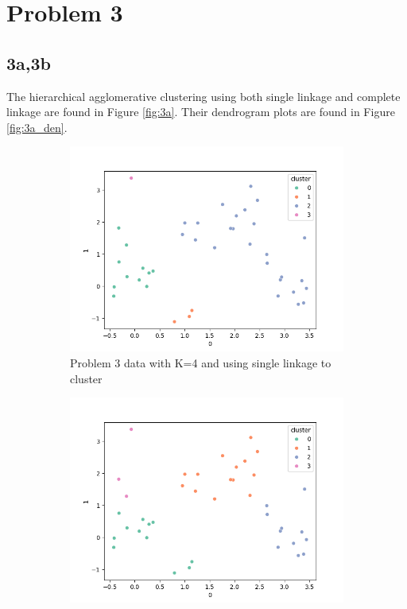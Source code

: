 \documentclass[12pt]{article}
\begin{document}
\clearpage


\section*{Problem 3}

\subsection*{3a,3b}

The hierarchical agglomerative clustering using both single linkage and complete linkage are found in Figure \ref{fig:3a}. Their dendrogram plots are found in Figure \ref{fig:3a_den}.

\begin{figure}[ht!]
    \begin{subfigure}{0.45\textwidth}
        \centering
        \includegraphics[width=\linewidth]{../plots/single_linkage.png}
        \caption{Problem 3 data with K=4 and using single linkage to cluster}
    \end{subfigure}
    \begin{subfigure}{0.45\textwidth}
        \centering
        \includegraphics[width=\linewidth]{../plots/complete_linkage.png}

\end{subfigure}
\end{figure}
\end{document}
